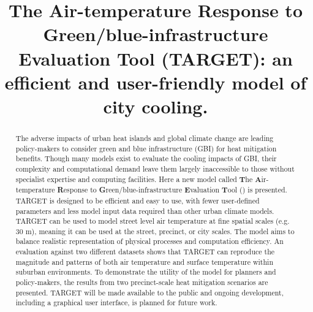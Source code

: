 \documentclass[final,3p,times,authoryear]{elsarticle}
\begin{document}
\linenumbers



\begin{frontmatter}





\title{The Air-temperature Response to Green/blue-infrastructure Evaluation Tool (TARGET): an efficient and user-friendly model of city cooling.} 





\begin{abstract}

The adverse impacts of urban heat islands and global climate change are leading policy-makers to consider green and blue infrastructure (GBI)  for heat mitigation benefits.  Though many models exist to evaluate the cooling impacts of GBI, their complexity and computational demand leave them largely inaccessible to those  without specialist expertise and computing facilities. Here a new model called \textbf{T}he \textbf{A}ir-temperature \textbf{R}esponse to \textbf{G}reen/blue-infrastructure \textbf{E}valuation \textbf{T}ool () is presented. TARGET is designed to be efficient and easy to use, with fewer user-defined parameters and less model input data required than other urban climate models.  TARGET can be used to model street level air temperature at fine spatial scales (e.g. 30 m), meaning it can be used at the street, precinct, or city scales. The model aims to balance realistic representation of physical processes and computation efficiency.  An evaluation  against two different datasets shows that TARGET can reproduce the magnitude and patterns of both air temperature and surface temperature within suburban environments.  To demonstrate the utility of the model for planners and policy-makers,  the results from two precinct-scale heat mitigation scenarios are presented. TARGET will be made available to the public and ongoing development, including a graphical user interface, is planned for future work.  



\end{abstract}
\end{frontmatter}
\end{document}
